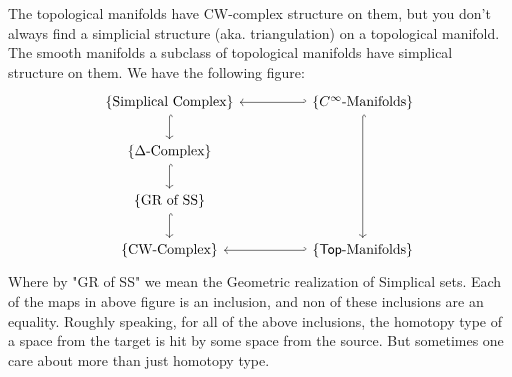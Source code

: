 The topological manifolds have CW-complex structure on them, but you don't always find a simplicial structure (aka. triangulation) on a topological manifold.
The smooth manifolds a subclass of topological manifolds have simplical structure on them.
We have the following figure:
\[\begin{tikzcd}
	\{\text{Simplical Complex}\} \arrow[d, hook] &  & \{C^{\infty}\text{-Manifolds}\} \arrow[ll, hook'] \arrow[ddd, hook] \\
	\{\Delta\text{-Complex}\} \arrow[d, hook]    &  & \\
	\{\text{GR of SS}\} \arrow[d, hook]          &  & \\
	\{\text{CW-Complex}\}                        &  & \{\topsp\text{-Manifolds}\} \arrow[ll, hook']                      
\end{tikzcd}\]
Where by "GR of SS" we mean the Geometric realization of Simplical sets.
Each of the maps in above figure is an inclusion, and non of these inclusions are an equality.
Roughly speaking, for all of the above inclusions, the homotopy type of a space from the target is hit by some space from the source.
But sometimes one care about more than just homotopy type. 



 
